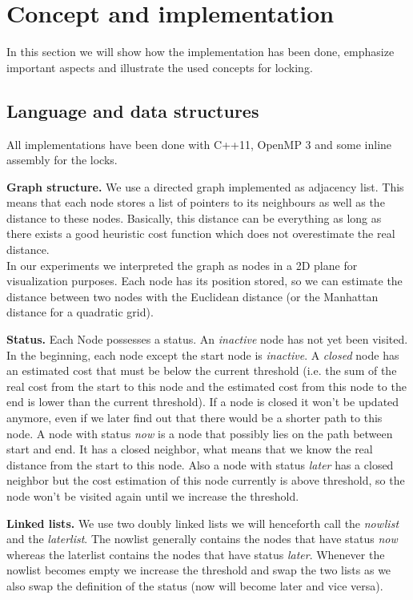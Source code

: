 \documentclass[letterpaper]{article}
\newcommand{\mypar}[1]{{\bf #1.}}
\begin{document}
\section{Concept and implementation}\label{sec:impl}

In this section we will show how the implementation has been done, emphasize important aspects and illustrate the used concepts for locking. 

\subsection{Language and data structures}\label{ssec:lang}

All implementations have been done with C++11, OpenMP 3 and some inline assembly for the locks.

\mypar{Graph structure}
We use a directed graph implemented as adjacency list. This means that each node stores a list of pointers to its neighbours as well as the distance to these nodes. Basically, this distance can be everything as long as there exists a good heuristic cost function which does not overestimate the real distance. \\
In our experiments we interpreted the graph as nodes in a 2D plane for visualization purposes. Each node has its position stored, so we can estimate the distance between two nodes with the Euclidean distance (or the Manhattan distance for a quadratic grid).

\mypar{Status}
Each Node possesses a status. An \textit{inactive} node has not yet been visited. In the beginning, each node except the start node is \textit{inactive}. A \textit{closed} node has an estimated cost that must be below the current threshold (i.e. the sum of the real cost from the start to this node and the estimated cost from this node to the end is lower than the current threshold). If a node is closed it won't be updated anymore, even if we later find out that there would be a shorter path to this node. A node with status \textit{now} is a node that possibly lies on the path between start and end. It has a closed neighbor, what means that we know the real distance from the start to this node. Also a node with status \textit{later} has a closed neighbor but the cost estimation of this node currently is above threshold, so the node won't be visited again until we increase the threshold.

\mypar{Linked lists}
We use two doubly linked lists we will henceforth call the \textit{nowlist} and the \textit{laterlist}. The nowlist generally contains the nodes that have status \textit{now} whereas the laterlist contains the nodes that have status \textit{later}. Whenever the nowlist becomes empty we increase the threshold and swap the two lists as we also swap the definition of the status (now will become later and vice versa). 
\end{document}
